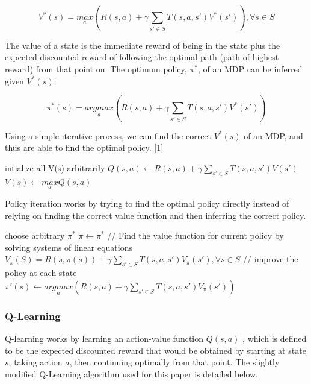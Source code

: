\documentclass[a4paper,10pt]{article}
\begin{document}
\begin{equation}
V^*(s) = \underset{a}{max} (R(s,a) + \gamma \sum\limits_{s' \in S} T(s, a, s') V^*(s')), \forall s\in S
\end{equation}

The value of a state is the immediate reward of being in the state plus the expected discounted reward of following the optimal path (path of highest reward) from that point on. The optimum policy, $\pi^*$, of an MDP can be inferred given $V^*(s)$:


\begin{equation}
\pi^*(s) = \underset{a}{argmax}(R(s,a) + \gamma \sum\limits_{s' \in S} T(s,a,s') V^*(s'))
\end{equation}

Using a simple iterative process, we can find the correct $V^*(s)$ of an MDP, and thus are able to find the optimal policy. [1]\\

\begin{algorithmic}[H]
\scriptsize
\ttfamily
  \STATE intialize all V(s) arbitrarily
  \REPEAT
			\STATE $Q(s,a) \leftarrow R(s,a) + \gamma \sum\limits_{s'  \in S} T(s, a, s') V(s')$
		\ENDFOR
		\STATE $V(s) \leftarrow \underset{a}{max}Q(s,a)$
	\ENDFOR
\end{algorithmic}

Policy iteration works by trying to find the optimal policy directly instead of relying on finding the correct value function and then inferring the correct policy.\\

\begin{algorithmic}[H]
\scriptsize
\ttfamily
\STATE choose arbitrary $\pi^*$
\REPEAT
	\STATE $\pi \leftarrow \pi^* $
	\STATE  // Find the value function for current policy by solving systems of linear equations
	\STATE $V_\pi(S) = R(s, \pi(s)) + \gamma \sum\limits_{s' \in S} T(s, a, s') V_\pi(s'), \forall s \in S$
	\STATE // improve the policy at each state
	\STATE $\pi'(s) \leftarrow \underset{a}{argmax}(R(s,a) + \gamma \sum\limits_{s' \in S} T(s, a, s') V_\pi(s'))$

\end{algorithmic}

\subsubsection{Q-Learning}
Q-learning works by learning an action-value function $Q(s,a)$ , which is defined to be the expected discounted reward that would be obtained by starting at state $s$, taking action $a$, then continuing optimally from that point. The slightly modified Q-Learning algorithm used for this paper is detailed below.\\
\end{document}
